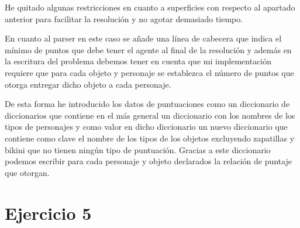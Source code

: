\documentclass[12pt,a4paper]{article}
\begin{document}


He quitado algunas restricciones en cuanto a superficies con respecto al apartado anterior para facilitar la resolución y no agotar demasiado tiempo.

En cuanto al parser en este caso se añade una línea de cabecera que indica el mínimo de puntos que debe tener el agente al final de la resolución y además en la escritura del problema debemos tener en cuenta que mi implementación requiere que para cada objeto y personaje se establezca el número de puntos que otorga entregar dicho objeto a cada personaje.

De esta forma he introducido los datos de puntuaciones como un diccionario de diccionarios que contiene en el más general un diccionario con los nombres de los tipos de personajes y como valor en dicho diccionario un nuevo diccionario que contiene como clave el nombre de los tipos de los objetos excluyendo zapatillas y bikini que no tienen ningún tipo de puntuación. Gracias a este diccionario podemos escribir para cada personaje y objeto declarados la relación de puntaje que otorgan.

\section{Ejercicio 5}
\end{document}
